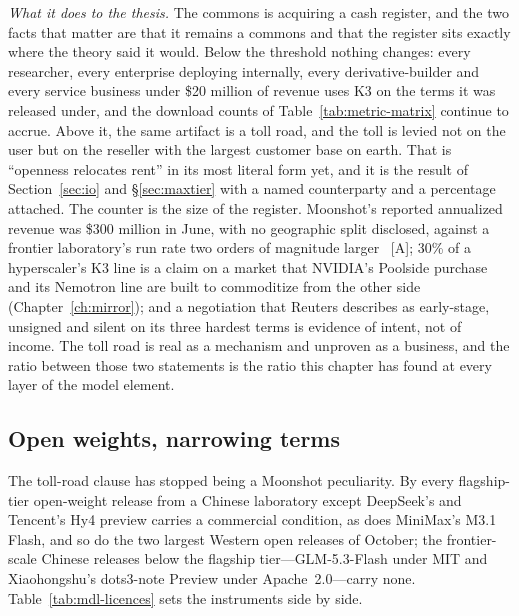 \emph{What it does to the thesis.} The commons is acquiring a cash register, and the two facts that matter are that it remains a commons and that the register sits exactly where the theory said it would. Below the threshold nothing changes: every researcher, every enterprise deploying internally, every derivative-builder and every service business under \$20 million of revenue uses K3 on the terms it was released under, and the download counts of Table~\ref{tab:metric-matrix} continue to accrue. Above it, the same artifact is a toll road, and the toll is levied not on the user but on the reseller with the largest customer base on earth. That is ``openness relocates rent'' in its most literal form yet, and it is the result of Section~\ref{sec:io} and \S\ref{sec:maxtier} with a named counterparty and a percentage attached. The counter is the size of the register. Moonshot's reported annualized revenue was \$300 million in June, with no geographic split disclosed, against a frontier laboratory's run rate two orders of magnitude larger~\cite{moonshot-ipo} [A]; 30\% of a hyperscaler's K3 line is a claim on a market that NVIDIA's Poolside purchase and its Nemotron line are built to commoditize from the other side (Chapter~\ref{ch:mirror}); and a negotiation that Reuters describes as early-stage, unsigned and silent on its three hardest terms is evidence of intent, not of income. The toll road is real as a mechanism and unproven as a business, and the ratio between those two statements is the ratio this chapter has found at every layer of the model element.

\subsection{Open weights, narrowing terms}
\label{sec:mdl-licence-narrowing}

The toll-road clause has stopped being a Moonshot peculiarity. By \datafreeze every flagship-tier open-weight release from a Chinese laboratory except DeepSeek's and Tencent's Hy4 preview carries a commercial condition, as does MiniMax's M3.1 Flash, and so do the two largest Western open releases of October; the frontier-scale Chinese releases below the flagship tier---GLM-5.3-Flash under MIT and Xiaohongshu's dots3-note Preview under Apache~2.0---carry none. Table~\ref{tab:mdl-licences} sets the instruments side by side.

